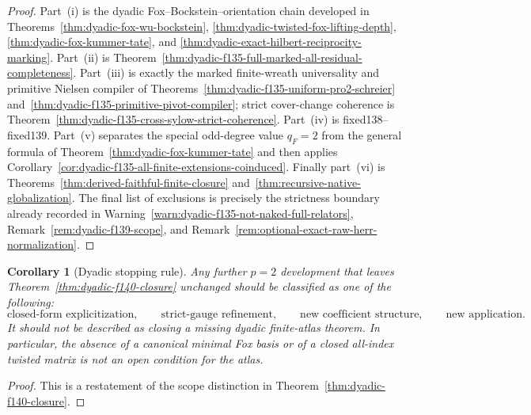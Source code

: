\documentclass[11pt]{article}
\newtheorem{corollary}[theorem]{Corollary}
\theoremstyle{definition}
\begin{document}
\begin{proof}
Part~(i) is the dyadic Fox--Bockstein--orientation chain
developed in
Theorems~\ref{thm:dyadic-fox-wu-bockstein},
\ref{thm:dyadic-twisted-fox-lifting-depth},
\ref{thm:dyadic-fox-kummer-tate}, and
\ref{thm:dyadic-exact-hilbert-reciprocity-marking}.
Part~(ii) is
Theorem~\ref{thm:dyadic-f135-full-marked-all-residual-completeness}.
Part~(iii) is exactly the marked finite-wreath
universality and primitive Nielsen compiler of
Theorems~\ref{thm:dyadic-f135-uniform-pro2-schreier}
and~\ref{thm:dyadic-f135-primitive-pivot-compiler};
strict cover-change coherence is
Theorem~\ref{thm:dyadic-f135-cross-sylow-strict-coherence}.
Part~(iv) is fixed138--fixed139.
Part~(v) separates the special odd-degree value
$q_F=2$ from the general formula of
Theorem~\ref{thm:dyadic-fox-kummer-tate} and then applies
Corollary~\ref{cor:dyadic-f135-all-finite-extensions-coinduced}.
Finally part~(vi) is
Theorems~\ref{thm:derived-faithful-finite-closure}
and~\ref{thm:recursive-native-globalization}.
The final list of exclusions is precisely the
strictness boundary already recorded in
Warning~\ref{warn:dyadic-f135-not-naked-full-relators},
Remark~\ref{rem:dyadic-f139-scope}, and
Remark~\ref{rem:optional-exact-raw-herr-normalization}.
\end{proof}

\begin{corollary}[Dyadic stopping rule]
\label{cor:dyadic-f140-stopping-rule}
Any further $p=2$ development that leaves
Theorem~\ref{thm:dyadic-f140-closure} unchanged should
be classified as one of the following:
\[
\text{closed-form explicitization},\qquad
\text{strict-gauge refinement},\qquad
\text{new coefficient structure},\qquad
\text{new application}.
\]
It should not be described as closing a missing dyadic
finite-atlas theorem.  In particular, the absence of a
canonical minimal Fox basis or of a closed all-index
twisted matrix is not an open condition for the atlas.
\end{corollary}

\begin{proof}
This is a restatement of the scope distinction in
Theorem~\ref{thm:dyadic-f140-closure}.
\end{proof}
\end{document}
